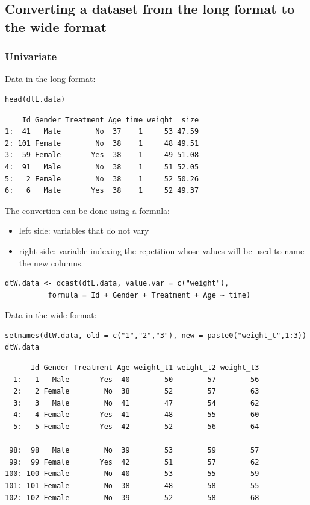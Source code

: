 \documentclass{article}
\begin{document}
\subsection{Converting a dataset from the long format to the wide format}
\label{sec:orgd88c4ea}

\subsubsection{Univariate}
\label{sec:org399ad8b}
Data in the long format:
\lstset{language=r,label= ,caption= ,captionpos=b,numbers=none}
\begin{lstlisting}
head(dtL.data)
\end{lstlisting}

\begin{verbatim}
    Id Gender Treatment Age time weight  size
1:  41   Male        No  37    1     53 47.59
2: 101 Female        No  38    1     48 49.51
3:  59 Female       Yes  38    1     49 51.08
4:  91   Male        No  38    1     51 52.05
5:   2 Female        No  38    1     52 50.26
6:   6   Male       Yes  38    1     52 49.37
\end{verbatim}

The convertion can be done using a formula:
\begin{itemize}
\item left side: variables that do not vary
\item right side: variable indexing the repetition whose values will be
used to name the new columns.
\end{itemize}
\lstset{language=r,label= ,caption= ,captionpos=b,numbers=none}
\begin{lstlisting}
dtW.data <- dcast(dtL.data, value.var = c("weight"),
		  formula = Id + Gender + Treatment + Age ~ time)
\end{lstlisting}

Data in the wide format:
\lstset{language=r,label= ,caption= ,captionpos=b,numbers=none}
\begin{lstlisting}
setnames(dtW.data, old = c("1","2","3"), new = paste0("weight_t",1:3))
dtW.data
\end{lstlisting}

\begin{verbatim}
      Id Gender Treatment Age weight_t1 weight_t2 weight_t3
  1:   1   Male       Yes  40        50        57        56
  2:   2 Female        No  38        52        57        63
  3:   3   Male        No  41        47        54        62
  4:   4 Female       Yes  41        48        55        60
  5:   5 Female       Yes  42        52        56        64
 ---                                                       
 98:  98   Male        No  39        53        59        57
 99:  99 Female       Yes  42        51        57        62
100: 100 Female        No  40        53        55        59
101: 101 Female        No  38        48        58        55
102: 102 Female        No  39        52        58        68
\end{verbatim}
\end{document}
